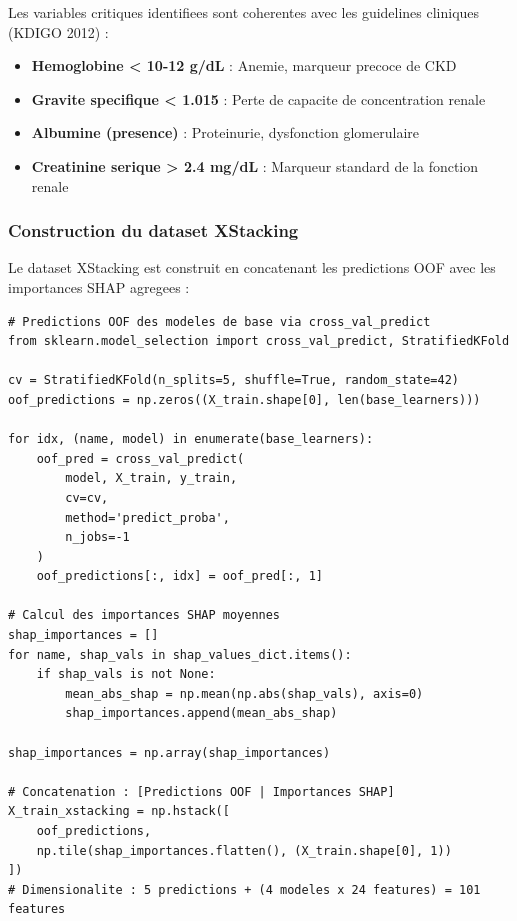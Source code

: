 Les variables critiques identifiees sont coherentes avec les guidelines cliniques (KDIGO 2012) :
\begin{itemize}
    \item \textbf{Hemoglobine < 10-12 g/dL} : Anemie, marqueur precoce de CKD
    \item \textbf{Gravite specifique < 1.015} : Perte de capacite de concentration renale
    \item \textbf{Albumine (presence)} : Proteinurie, dysfonction glomerulaire
    \item \textbf{Creatinine serique > 2.4 mg/dL} : Marqueur standard de la fonction renale
\end{itemize}

\subsubsection{Construction du dataset XStacking}

Le dataset XStacking est construit en concatenant les predictions OOF avec les importances SHAP agregees :

\begin{lstlisting}[style=reportPython, caption={Construction du dataset XStacking}]
# Predictions OOF des modeles de base via cross_val_predict
from sklearn.model_selection import cross_val_predict, StratifiedKFold

cv = StratifiedKFold(n_splits=5, shuffle=True, random_state=42)
oof_predictions = np.zeros((X_train.shape[0], len(base_learners)))

for idx, (name, model) in enumerate(base_learners):
    oof_pred = cross_val_predict(
        model, X_train, y_train, 
        cv=cv, 
        method='predict_proba',
        n_jobs=-1
    )
    oof_predictions[:, idx] = oof_pred[:, 1]

# Calcul des importances SHAP moyennes
shap_importances = []
for name, shap_vals in shap_values_dict.items():
    if shap_vals is not None:
        mean_abs_shap = np.mean(np.abs(shap_vals), axis=0)
        shap_importances.append(mean_abs_shap)

shap_importances = np.array(shap_importances)

# Concatenation : [Predictions OOF | Importances SHAP]
X_train_xstacking = np.hstack([
    oof_predictions,
    np.tile(shap_importances.flatten(), (X_train.shape[0], 1))
])
# Dimensionalite : 5 predictions + (4 modeles x 24 features) = 101 features
\end{lstlisting}

